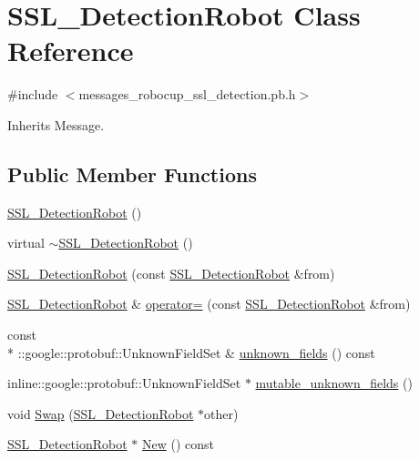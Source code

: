 \hypertarget{class_s_s_l___detection_robot}{\section{S\-S\-L\-\_\-\-Detection\-Robot Class Reference}
\label{class_s_s_l___detection_robot}
}


{\ttfamily \#include $<$messages\-\_\-robocup\-\_\-ssl\-\_\-detection.\-pb.\-h$>$}



Inherits Message.

\subsection*{Public Member Functions}
\begin{DoxyCompactItemize}
\item 
\hyperlink{class_s_s_l___detection_robot_ad0b7939296d1b47d27d993620cab18a5}{S\-S\-L\-\_\-\-Detection\-Robot} ()
\item 
virtual \hyperlink{class_s_s_l___detection_robot_a2a5d32abb71ccd838f45e293fca80d43}{$\sim$\-S\-S\-L\-\_\-\-Detection\-Robot} ()
\item 
\hyperlink{class_s_s_l___detection_robot_acbb276d5643b69e746182515906f5149}{S\-S\-L\-\_\-\-Detection\-Robot} (const \hyperlink{class_s_s_l___detection_robot}{S\-S\-L\-\_\-\-Detection\-Robot} \&from)
\item 
\hyperlink{class_s_s_l___detection_robot}{S\-S\-L\-\_\-\-Detection\-Robot} \& \hyperlink{class_s_s_l___detection_robot_ae9f968ef0d2d6e9a90667f4c1cd62201}{operator=} (const \hyperlink{class_s_s_l___detection_robot}{S\-S\-L\-\_\-\-Detection\-Robot} \&from)
\item 
const \\*
\-::google\-::protobuf\-::\-Unknown\-Field\-Set \& \hyperlink{class_s_s_l___detection_robot_a8e2233647fdd1542f570fa0c2157e184}{unknown\-\_\-fields} () const 
\item 
inline\-::google\-::protobuf\-::\-Unknown\-Field\-Set $\ast$ \hyperlink{class_s_s_l___detection_robot_a35b38186e9ac8feb5a04c43b48033dcd}{mutable\-\_\-unknown\-\_\-fields} ()
\item 
void \hyperlink{class_s_s_l___detection_robot_ade239c84172ba6b3082455be8f0ce2f6}{Swap} (\hyperlink{class_s_s_l___detection_robot}{S\-S\-L\-\_\-\-Detection\-Robot} $\ast$other)
\item 
\hyperlink{class_s_s_l___detection_robot}{S\-S\-L\-\_\-\-Detection\-Robot} $\ast$ \hyperlink{class_s_s_l___detection_robot_a932fe0cd33dcdffc67ddded39c84f920}{New} () const 

\end{DoxyCompactItemize}
